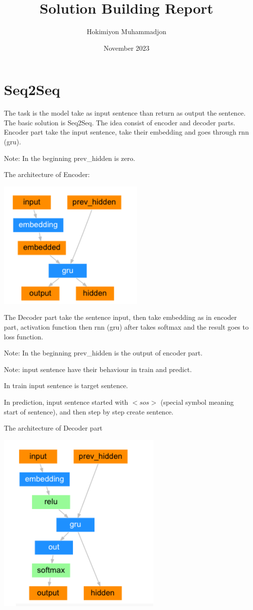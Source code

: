 \documentclass{article}
\title{Solution Building Report}
\author{Hokimiyon Muhammadjon}
\date{November 2023}
\begin{document}
\maketitle

\section{Seq2Seq}
The task is the model take as input sentence than return as output the sentence.
The basic solution is Seq2Seq. The idea consist of encoder and decoder parts.
Encoder part take the input sentence, take their embedding and goes through rnn (gru).

Note: In the beginning prev\_hidden is zero.

The architecture of Encoder:

\includegraphics[scale=0.4]{figures/Encoder_seq2seq.png}

The Decoder part take the sentence input, then take embedding as in encoder part, activation function then rnn (gru) after takes softmax and the result goes to loss function.

Note: In the beginning prev\_hidden is the output of encoder part.

Note: input sentence have their behaviour in train and predict.

    In train input sentence is target sentence.

    In prediction, input sentence started with $<sos>$ (special symbol meaning start of sentence), and then step by step create sentence.

The architecture of Decoder part

\includegraphics[scale=0.4]{figures/Decoder_seq2seq.png}
\end{document}
